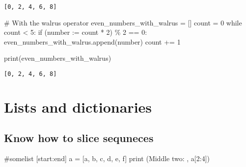 \documentclass[
]{report}
\newenvironment{Shaded}{\begin{snugshade}}{\end{snugshade}}
\newcommand{\BuiltInTok}[1]{\textcolor[rgb]{0.00,0.23,0.31}{#1}}
\newcommand{\CommentTok}[1]{\textcolor[rgb]{0.37,0.37,0.37}{#1}}
\newcommand{\ControlFlowTok}[1]{\textcolor[rgb]{0.00,0.23,0.31}{#1}}
\newcommand{\DecValTok}[1]{\textcolor[rgb]{0.68,0.00,0.00}{#1}}
\newcommand{\NormalTok}[1]{\textcolor[rgb]{0.00,0.23,0.31}{#1}}
\newcommand{\OperatorTok}[1]{\textcolor[rgb]{0.37,0.37,0.37}{#1}}
\newcommand{\StringTok}[1]{\textcolor[rgb]{0.13,0.47,0.30}{#1}}
\begin{document}
\begin{verbatim}
[0, 2, 4, 6, 8]
\end{verbatim}

\begin{Shaded}
\begin{Highlighting}[]
\CommentTok{\# With the walrus operator}
\NormalTok{even\_numbers\_with\_walrus }\OperatorTok{=}\NormalTok{ []}
\NormalTok{count }\OperatorTok{=} \DecValTok{0}
\ControlFlowTok{while}\NormalTok{ count }\OperatorTok{\textless{}} \DecValTok{5}\NormalTok{:}
    \ControlFlowTok{if}\NormalTok{ (number }\OperatorTok{:=}\NormalTok{ count }\OperatorTok{*} \DecValTok{2}\NormalTok{) }\OperatorTok{\%} \DecValTok{2} \OperatorTok{==} \DecValTok{0}\NormalTok{:}
\NormalTok{        even\_numbers\_with\_walrus.append(number)}
\NormalTok{        count }\OperatorTok{+=} \DecValTok{1}

\BuiltInTok{print}\NormalTok{(even\_numbers\_with\_walrus)}
\end{Highlighting}
\end{Shaded}

\begin{verbatim}
[0, 2, 4, 6, 8]
\end{verbatim}

\hypertarget{lists-and-dictionaries}{%
\section{Lists and dictionaries}\label{lists-and-dictionaries}}

\hypertarget{know-how-to-slice-sequneces}{%
\subsection{Know how to slice
sequneces}\label{know-how-to-slice-sequneces}}

\begin{Shaded}
\begin{Highlighting}[]
\CommentTok{\#somelist [start:end]}
\NormalTok{a }\OperatorTok{=}\NormalTok{ [}\StringTok{\textquotesingle{}a\textquotesingle{}}\NormalTok{, }\StringTok{\textquotesingle{}b\textquotesingle{}}\NormalTok{, }\StringTok{\textquotesingle{}c\textquotesingle{}}\NormalTok{, }\StringTok{\textquotesingle{}d\textquotesingle{}}\NormalTok{, }\StringTok{\textquotesingle{}e\textquotesingle{}}\NormalTok{, }\StringTok{\textquotesingle{}f\textquotesingle{}}\NormalTok{]}
\BuiltInTok{print}\NormalTok{ (}\StringTok{\textquotesingle{}Middle two: \textquotesingle{}}\NormalTok{, a[}\DecValTok{2}\NormalTok{:}\DecValTok{4}\NormalTok{])}
\end{Highlighting}
\end{Shaded}
\end{document}
